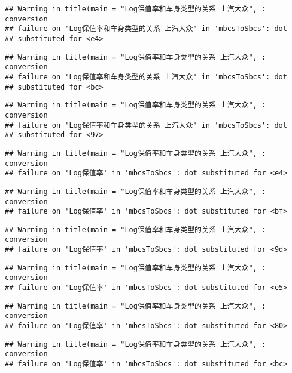\documentclass[]{article}
\begin{document}
\begin{verbatim}
## Warning in title(main = "Log保值率和车身类型的关系 上汽大众", : conversion
## failure on 'Log保值率和车身类型的关系 上汽大众' in 'mbcsToSbcs': dot
## substituted for <e4>
\end{verbatim}

\begin{verbatim}
## Warning in title(main = "Log保值率和车身类型的关系 上汽大众", : conversion
## failure on 'Log保值率和车身类型的关系 上汽大众' in 'mbcsToSbcs': dot
## substituted for <bc>
\end{verbatim}

\begin{verbatim}
## Warning in title(main = "Log保值率和车身类型的关系 上汽大众", : conversion
## failure on 'Log保值率和车身类型的关系 上汽大众' in 'mbcsToSbcs': dot
## substituted for <97>
\end{verbatim}

\begin{verbatim}
## Warning in title(main = "Log保值率和车身类型的关系 上汽大众", : conversion
## failure on 'Log保值率' in 'mbcsToSbcs': dot substituted for <e4>
\end{verbatim}

\begin{verbatim}
## Warning in title(main = "Log保值率和车身类型的关系 上汽大众", : conversion
## failure on 'Log保值率' in 'mbcsToSbcs': dot substituted for <bf>
\end{verbatim}

\begin{verbatim}
## Warning in title(main = "Log保值率和车身类型的关系 上汽大众", : conversion
## failure on 'Log保值率' in 'mbcsToSbcs': dot substituted for <9d>
\end{verbatim}

\begin{verbatim}
## Warning in title(main = "Log保值率和车身类型的关系 上汽大众", : conversion
## failure on 'Log保值率' in 'mbcsToSbcs': dot substituted for <e5>
\end{verbatim}

\begin{verbatim}
## Warning in title(main = "Log保值率和车身类型的关系 上汽大众", : conversion
## failure on 'Log保值率' in 'mbcsToSbcs': dot substituted for <80>
\end{verbatim}

\begin{verbatim}
## Warning in title(main = "Log保值率和车身类型的关系 上汽大众", : conversion
## failure on 'Log保值率' in 'mbcsToSbcs': dot substituted for <bc>
\end{verbatim}
\end{document}
